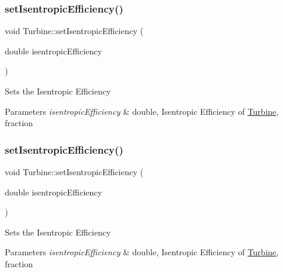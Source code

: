 \subsubsection{\texorpdfstring{set\+Isentropic\+Efficiency()}{setIsentropicEfficiency()}\hspace{0.1cm}{\footnotesize\ttfamily [1/3]}}
{\footnotesize\ttfamily void Turbine\+::set\+Isentropic\+Efficiency (\begin{DoxyParamCaption}\item[{double}]{isentropic\+Efficiency }\end{DoxyParamCaption})}

Sets the Isentropic Efficiency


\begin{DoxyParams}{Parameters}
{\em isentropic\+Efficiency} & double, Isentropic Efficiency of \hyperlink{class_turbine}{Turbine}, fraction \\
\hline
\end{DoxyParams}
\mbox{\label{class_turbine_ae67daa481ef48bcf8aef84bcccb4611d}} 
\subsubsection{\texorpdfstring{set\+Isentropic\+Efficiency()}{setIsentropicEfficiency()}\hspace{0.1cm}{\footnotesize\ttfamily [2/3]}}
{\footnotesize\ttfamily void Turbine\+::set\+Isentropic\+Efficiency (\begin{DoxyParamCaption}\item[{double}]{isentropic\+Efficiency }\end{DoxyParamCaption})}

Sets the Isentropic Efficiency


\begin{DoxyParams}{Parameters}
{\em isentropic\+Efficiency} & double, Isentropic Efficiency of \hyperlink{class_turbine}{Turbine}, fraction \\
\hline
\end{DoxyParams}
\mbox{\label{class_turbine_ae67daa481ef48bcf8aef84bcccb4611d}} 
